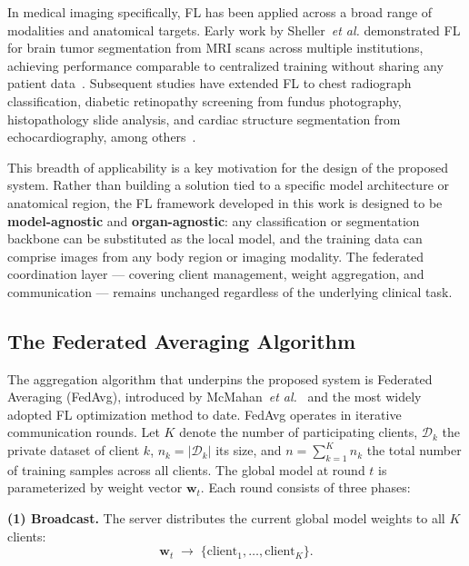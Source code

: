 In medical imaging specifically, FL has been applied across a broad range of
modalities and anatomical targets. Early work by Sheller~\textit{et al.}
demonstrated FL for brain tumor segmentation from MRI scans across multiple
institutions, achieving performance comparable to centralized training without
sharing any patient data~\cite{sheller2019}. Subsequent studies have extended
FL to chest radiograph classification, diabetic retinopathy screening from
fundus photography, histopathology slide analysis, and cardiac structure
segmentation from echocardiography, among others~\cite{rieke2020}.
 
This breadth of applicability is a key motivation for the design of the
proposed system. Rather than building a solution tied to a specific model
architecture or anatomical region, the FL framework developed in this work
is designed to be \textbf{model-agnostic} and \textbf{organ-agnostic}: any
classification or segmentation backbone can be substituted as the local
model, and the training data can comprise images from any body region or
imaging modality. The federated coordination layer — covering client
management, weight aggregation, and communication — remains unchanged
regardless of the underlying clinical task.
 
\subsection{The Federated Averaging Algorithm}
\label{subsec:fedavg}
 
The aggregation algorithm that underpins the proposed system is Federated
Averaging (FedAvg), introduced by McMahan~\textit{et al.}~\cite{mcmahan2017}
and the most widely adopted FL optimization method to date. FedAvg operates
in iterative communication rounds. Let $K$ denote the number of participating
clients, $\mathcal{D}_k$ the private dataset of client $k$, $n_k =
|\mathcal{D}_k|$ its size, and $n = \sum_{k=1}^{K} n_k$ the total number of
training samples across all clients. The global model at round $t$ is
parameterized by weight vector $\mathbf{w}_t$. Each round consists of three
phases:
 
\textbf{(1) Broadcast.} The server distributes the current global model
weights to all $K$ clients:
\begin{equation}
    \mathbf{w}_t \;\longrightarrow\; \{\text{client}_1, \dots, \text{client}_K\}.
\end{equation}
 
